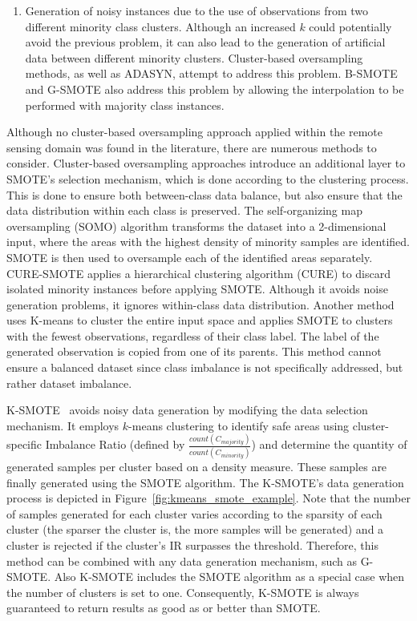 \documentclass[parskip=full]{scrartcl}
\begin{document}
\begin{enumerate}
	\item Generation of noisy instances due to the use of observations from two
	      different minority class clusters. Although an increased $k$ could
	      potentially avoid the previous problem, it can also lead to the
	      generation of artificial data between different minority clusters.
	      Cluster-based oversampling methods, as well as ADASYN, attempt to
	      address this problem. B-SMOTE \cite{Han2005} and G-SMOTE also address
	      this problem by allowing the interpolation to be performed with
	      majority class instances.
\end{enumerate}

Although no cluster-based oversampling approach applied within the remote
sensing domain was found in the literature, there are numerous methods to
consider. Cluster-based oversampling approaches introduce an additional layer to
SMOTE's selection mechanism, which is done according to the clustering process.
This is done to ensure both between-class data balance, but also ensure that the
data distribution within each class is preserved. The self-organizing map
oversampling (SOMO) \cite{Douzas2017} algorithm transforms the dataset into a
2-dimensional input, where the areas with the highest density of minority
samples are identified. SMOTE is then used to oversample each of the identified
areas separately. CURE-SMOTE \cite{Ma2017} applies a hierarchical clustering
algorithm (CURE) to discard isolated minority instances before applying SMOTE.
Although it avoids noise generation problems, it ignores within-class data
distribution. Another method \cite{Santos2015} uses K-means to cluster the
entire input space and applies SMOTE to clusters with the fewest observations,
regardless of their class label. The label of the generated observation is
copied from one of its parents. This method cannot ensure a balanced dataset
since class imbalance is not specifically addressed, but rather dataset
imbalance.

K-SMOTE~\cite{Douzas2018} avoids noisy data generation by modifying the data
selection mechanism. It employs $k$-means clustering to identify safe areas
using cluster-specific Imbalance Ratio (defined by
$\frac{count(C_{majority})}{count(C_{minority})}$) and determine the quantity of
generated samples per cluster based on a density measure. These samples are
finally generated using the SMOTE algorithm. The K-SMOTE's data generation
process is depicted in Figure~\ref{fig:kmeans_smote_example}. Note that the
number of samples generated for each cluster varies according to the sparsity of
each cluster (the sparser the cluster is, the more samples will be generated)
and a cluster is rejected if the cluster's IR surpasses the threshold.
Therefore, this method can be combined with any data generation mechanism, such
as G-SMOTE. Also K-SMOTE includes the SMOTE algorithm as a special case when the
number of clusters is set to one. Consequently, K-SMOTE is always guaranteed to
return results as good as or better than SMOTE.
\end{document}
